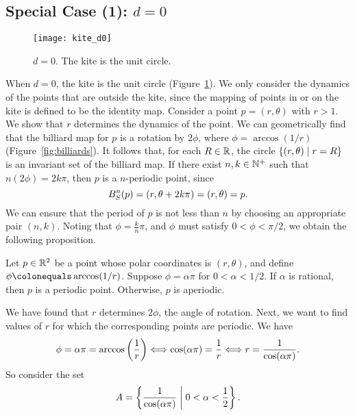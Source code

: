 \documentclass[12pt,twoside]{book}
\begin{document}
\subsection*{Special Case (1): $d = 0$}
\begin{figure}[ht]
  \begin{center}
    \texttt{[image: kite\_d0]}
    \caption{$d = 0$. The kite is the unit circle.}
    \label{fig:kite-circle}
  \end{center}
\end{figure}
When $d = 0$, the kite is the unit circle (Figure~\ref{fig:kite-circle}).
We only consider the dynamics of the points that are outside the kite, since the mapping of points in or on the kite is defined to be the identity map.
Consider a point $p = (r, \theta)$ with $r > 1$.
We show that $r$ determines the dynamics of the point.
We can geometrically find that the billiard map for $p$ is a rotation by $2\phi$, where $\phi = \arccos(1/r)$ (Figure~\ref{fig:billiards}).
It follows that, for each $R \in \mathbb{R}$, the circle $\left \{ (r,\theta) \mathrel{} \middle| \mathrel{} r = R \right \}$ is an invariant set of the billiard map.
If there exist $n, k \in \mathbb{N}^+$ such that $n(2\phi) = 2k\pi$, then $p$ is a $n$-periodic point, since 
\begin{equation*}
  B_S^{n}(p) = (r, \theta + 2k\pi) = (r, \theta) = p.
\end{equation*}
We can ensure that the period of $p$ is not less than $n$ by choosing an appropriate pair $(n,k)$.
Noting that $\phi = \frac{k}{n}\pi$, and $\phi$ must satisfy $0 < \phi < \pi/2$, we obtain the following proposition.
\begin{proposition}
  Let $p \in \mathbb{R}^2$ be a point whose polar coordinates is $(r,\theta)$, and define $\phi \ceq \arccos(1/r)$.
  Suppose $\phi = \alpha\pi$ for $0 < \alpha < 1/2$.
  If $\alpha$ is rational, then $p$ is a periodic point.
  Otherwise, $p$ is aperiodic.
\end{proposition}
We have found that $r$ determines $2\phi$, the angle of rotation.
Next, we want to find values of $r$ for which the corresponding points are periodic.
We have
\begin{equation*}
  \phi = \alpha\pi = \arccos\left (  \frac{1}{r}  \right ) 
  \Longleftrightarrow \cos(\alpha\pi) = \frac{1}{r}
  \Longleftrightarrow r = \frac{1}{\cos(\alpha\pi)}.
\end{equation*}
So consider the set
\begin{equation*}
  A = \left \{ \frac{1}{\cos(\alpha\pi)} \mathrel{} \middle| \mathrel{} 0 < \alpha < \frac{1}{2} \right \}.
\end{equation*}
\end{document}
